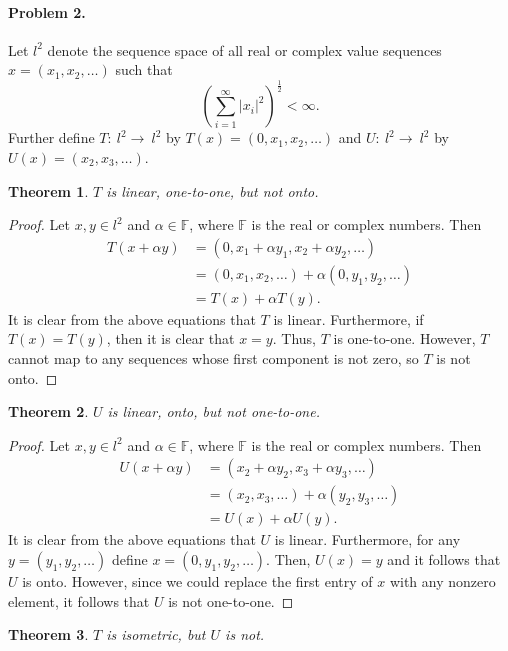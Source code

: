\documentclass{article}
\newtheorem{theorem}{Theorem}
\begin{document}
\paragraph*{Problem 2.}	Let $l^{2}$ denote the sequence space of all real or complex value sequences $x=(x_{1},x_{2},\ldots)$ such that
\[
\left(\sum_{i=1}^{\infty}|x_{i}|^{2}\right)^{\frac{1}{2}}<\infty.
\]
Further define $T\colon~l^{2}\rightarrow~l^{2}$ by $T(x)=(0,x_{1},x_{2},\ldots)$ and $U\colon~l^{2}\rightarrow~l^{2}$ by $U(x)=(x_{2},x_{3},\ldots)$. 
\begin{theorem}
$T$ is linear, one-to-one, but not onto. 
\end{theorem}
\begin{proof}
Let $x,y\in l^{2}$ and $\alpha\in\mathbb{F}$, where $\mathbb{F}$ is the real or complex numbers. Then
\begin{align*}
T(x+\alpha y)&=(0,x_{1}+\alpha y_{1},x_{2}+\alpha y_{2},\ldots) \\
&=(0,x_{1},x_{2},\ldots)+\alpha(0,y_{1},y_{2},\ldots) \\
&=T(x)+\alpha T(y).
\end{align*}
It is clear from the above equations that $T$ is linear. Furthermore, if $T(x)=T(y)$, then it is clear that $x=y$. Thus, $T$ is one-to-one. However, $T$ cannot map to any sequences whose first component is not zero, so $T$ is not onto. 
\end{proof}
\begin{theorem}
$U$ is linear, onto, but not one-to-one.
\end{theorem}
\begin{proof}
Let $x,y\in l^{2}$ and $\alpha\in\mathbb{F}$, where $\mathbb{F}$ is the real or complex numbers. Then
\begin{align*}
U(x+\alpha y)&=(x_{2}+\alpha y_{2},x_{3}+\alpha y_{3},\ldots) \\
&=(x_{2},x_{3},\ldots)+\alpha (y_{2},y_{3},\ldots) \\
&=U(x)+\alpha U(y).
\end{align*}
It is clear from the above equations that $U$ is linear. Furthermore, for any $y=(y_{1},y_{2},\ldots)$ define $x=(0,y_{1},y_{2},\ldots)$. Then, $U(x)=y$ and it follows that $U$ is onto. However, since we could replace the first entry of $x$ with any nonzero element, it follows that $U$ is not one-to-one. 
\end{proof}
\begin{theorem}
$T$ is isometric, but $U$ is not.
\end{theorem}
\end{document}
